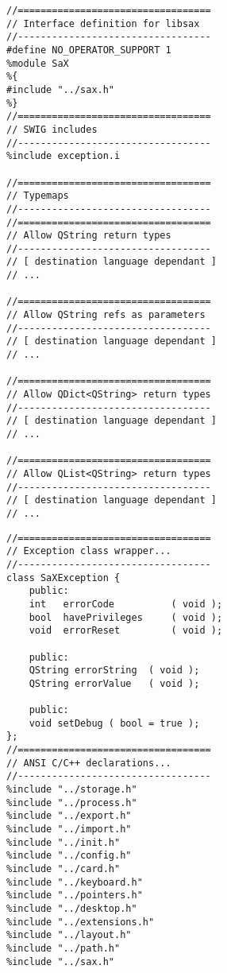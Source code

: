 \begin{Command}{12cm}
\begin{small}
\begin{verbatim}
//==================================
// Interface definition for libsax
//----------------------------------
#define NO_OPERATOR_SUPPORT 1
%module SaX
%{
#include "../sax.h"
%}
//==================================
// SWIG includes
//----------------------------------
%include exception.i

//==================================
// Typemaps
//----------------------------------
//==================================
// Allow QString return types
//----------------------------------
// [ destination language dependant ]
// ...

//==================================
// Allow QString refs as parameters
//----------------------------------
// [ destination language dependant ]
// ...

//==================================
// Allow QDict<QString> return types
//----------------------------------
// [ destination language dependant ]
// ...

//==================================
// Allow QList<QString> return types
//----------------------------------
// [ destination language dependant ]
// ...

\end{verbatim}
\end{small}
\end{Command}

\newpage

\begin{Command}{12cm}
\begin{small}
\begin{verbatim}
//==================================
// Exception class wrapper...
//----------------------------------
class SaXException {
    public:
    int   errorCode          ( void );
    bool  havePrivileges     ( void );
    void  errorReset         ( void );

    public:
    QString errorString  ( void );
    QString errorValue   ( void );

    public:
    void setDebug ( bool = true );
};
//==================================
// ANSI C/C++ declarations...
//----------------------------------
%include "../storage.h"
%include "../process.h"
%include "../export.h"
%include "../import.h"
%include "../init.h"
%include "../config.h"
%include "../card.h"
%include "../keyboard.h"
%include "../pointers.h"
%include "../desktop.h"
%include "../extensions.h"
%include "../layout.h"
%include "../path.h"
%include "../sax.h"
\end{verbatim}
\end{small}
\end{Command}

